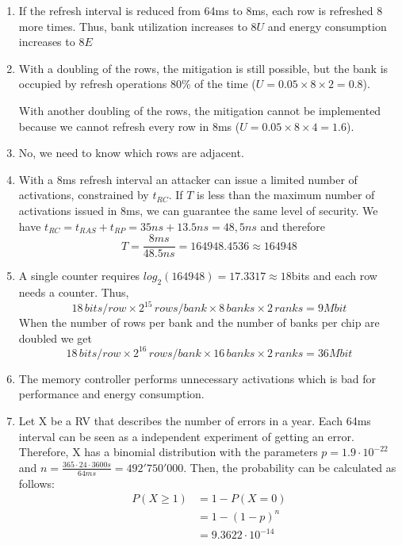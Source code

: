 \documentclass[a4paper]{article}
\begin{document}
\begin{enumerate}[label=\alph*)]
    \item If the refresh interval is reduced from 64ms to 8ms, each row is refreshed 8 more times.
        Thus, bank utilization increases to $8U$ and energy consumption increases to $8E$

    \item With a doubling of the rows, the mitigation is still possible, but the bank is occupied 
        by refresh operations 80\% of the time ($U = 0.05 \times 8 \times 2 = 0.8$).

        With another doubling of the rows, the mitigation cannot be implemented because we cannot refresh every
        row in 8ms ($U = 0.05 \times 8 \times 4 = 1.6$).

    \item No, we need to know which rows are adjacent.

    \item With a 8ms refresh interval an attacker can issue a limited number of activations, constrained
        by $t_{RC}$. If $T$ is less than the maximum number of activations issued in 8ms, we
        can guarantee the same level of security. We have $t_{RC} = t_{RAS} + t_{RP} = 35ns + 13.5 ns = 48,5ns$
        and therefore
        \begin{equation*}
        T = \frac{8ms}{48.5ns} = 164948.4536 \approx 164948
        \end{equation*}

    \item A single counter requires $log_2(164948) = 17.3317 \approx 18$bits and each row needs a counter.
        Thus,
        \begin{equation*}
            18 \, bits/row \times 2^{15} \, rows/bank \times 8 \, banks \times 2 \, ranks = 9Mbit
        \end{equation*}
        When the number of rows per bank and the number of banks per chip are doubled we get
        \begin{equation*}
            18 \, bits/row \times 2^{16} \, rows/bank \times 16 \, banks \times 2 \, ranks = 36Mbit
        \end{equation*}

    \item The memory controller performs unnecessary activations which is bad for performance and
        energy consumption.

    \item Let X be a RV that describes the number of errors in a year. Each 64ms interval can be seen
        as a independent experiment of getting an error. Therefore, X has a binomial distribution with
        the parameters $p=1.9\cdot10^{-22}$ and  $n=\frac{365 \cdot 24 \cdot 3600s}{64ms} = 492'750'000$.
        Then, the probability can be calculated as follows: 
        \begin{align*}
            P(X\geq1) &= 1 - P(X=0) \\
                      &= 1 - (1 - p)^n \\
                      &= 9.3622 \cdot 10^{-14}
        \end{align*}

\end{enumerate}
\end{document}
